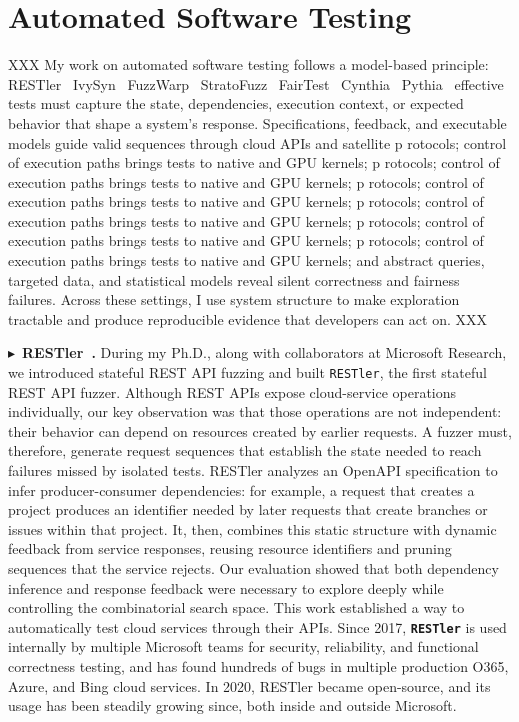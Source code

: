 \documentclass[10pt,letterpaper]{article}
\newcommand{\project}[2]{\par\Needspace{6\baselineskip}\noindent
  $\blacktriangleright$~\textbf{#1~\cite{#2}.}}
\begin{document}
\section{Automated Software Testing}
XXX My work on automated software testing follows a model-based principle:
RESTler~\cite{restler,restler2}
IvySyn~\cite{ivysyn}
FuzzWarp~\cite{fuzzwarp}
StratoFuzz~\cite{stratofuzz}
FairTest~\cite{fairtest}
Cynthia~\cite{cynthia}
Pythia~\cite{pythia}
effective tests must capture the state, dependencies, execution context, or
expected behavior that shape a system's response. Specifications, feedback,
and executable models guide valid sequences through cloud APIs and satellite
p rotocols; control of execution paths brings tests to native and GPU kernels;
p rotocols; control of execution paths brings tests to native and GPU kernels;
p rotocols; control of execution paths brings tests to native and GPU kernels;
p rotocols; control of execution paths brings tests to native and GPU kernels;
p rotocols; control of execution paths brings tests to native and GPU kernels;
p rotocols; control of execution paths brings tests to native and GPU kernels;
and abstract queries, targeted data, and statistical models reveal silent
correctness and fairness failures. Across these settings, I use system
structure to make exploration tractable and produce reproducible evidence
that developers can act on.
XXX


\project{RESTler}{restler}
During my Ph.D., along with collaborators at Microsoft Research, we introduced
stateful REST API fuzzing and built \texttt{RESTler},
the first stateful REST API fuzzer.
Although REST APIs expose cloud-service operations individually, our key
observation was that those
operations are not independent: their behavior can depend on resources created
by earlier requests. A fuzzer must, therefore, generate request sequences that
establish the state needed to reach failures missed by isolated tests. RESTler
analyzes an OpenAPI specification to infer producer-consumer dependencies:
for example, a request that creates a project produces an identifier needed by
later requests that create branches or issues within that project. It, then,
combines this static structure with dynamic feedback from service responses,
reusing resource identifiers and pruning sequences that the service rejects.
Our evaluation showed that both dependency inference and response feedback were
necessary to explore deeply while controlling the combinatorial search space.
This work
established a way to automatically test cloud services through their APIs.
Since 2017, \textbf{\texttt{RESTler}} is used internally by multiple Microsoft
teams for security, reliability, and functional correctness testing,
and has found hundreds of bugs in multiple production O365, Azure, and Bing
cloud services.
In 2020, RESTler became open-source, and its usage has been
steadily growing since, both inside and outside Microsoft.
\end{document}
